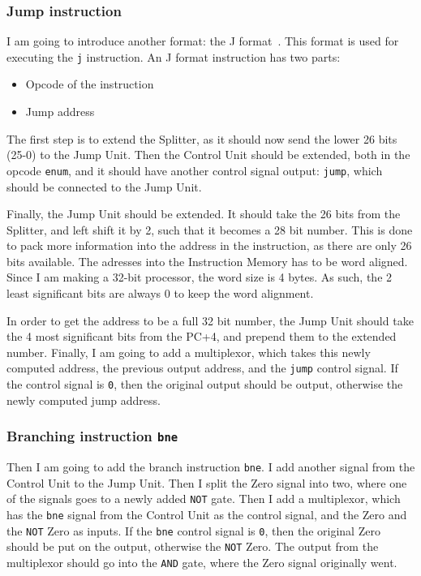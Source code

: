 \subsubsection*{Jump instruction}
I am going to introduce another format: the J format~\cite{ref:ark-book}. This
format is used for executing the \texttt{j} instruction. An J format
instruction has two parts:
\begin{itemize}
    \item {}
         Opcode of the instruction
    \item {}
         Jump address
\end{itemize}

The first step is to extend the Splitter, as it should now send the lower 26
bits (25-0) to the Jump Unit. Then the Control Unit should be extended, both in
the opcode \texttt{enum}, and it should have another control signal output:
\texttt{jump}, which should be connected to the Jump Unit.

Finally, the Jump Unit should be extended. It should take the 26 bits from the
Splitter, and left shift it by 2, such that it becomes a 28 bit number. This is
done to pack more information into the address in the instruction, as there are
only 26 bits available. The adresses into the Instruction Memory has to be word
aligned. Since I am making a 32-bit processor, the word size is 4 bytes. As
such, the 2 least significant bits are always 0 to keep the word alignment.

In order to get the address to be a full 32 bit number, the Jump Unit should
take the 4 most significant bits from the PC+4, and prepend them to
the extended number. Finally, I am going to add a multiplexor, which takes
this newly computed address, the previous output address, and the \texttt{jump}
control signal. If the control signal is \texttt{0}, then the original output
should be output, otherwise the newly computed jump address.

\subsubsection*{Branching instruction \texttt{bne}}
Then I am going to add the branch instruction \texttt{bne}. I add another
signal from the Control Unit to the Jump Unit. Then I split the Zero
signal into two, where one of the signals goes to a newly added
\texttt{NOT} gate.  Then I add a multiplexor, which has the \texttt{bne} signal
from the Control Unit as the control signal, and the Zero and the \texttt{NOT}
Zero as inputs. If the \texttt{bne} control signal is \texttt{0}, then the
original Zero should be put on the output, otherwise the \texttt{NOT} Zero. The
output from the multiplexor should go into the \texttt{AND} gate, where the
Zero signal originally went.

